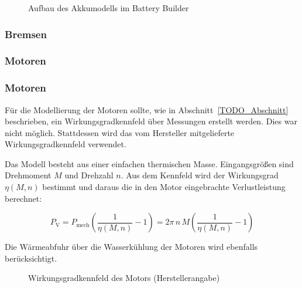 \begin{figure}[htbp]
    \centering
    \caption{Aufbau des Akkumodells im Battery Builder}
    \label{fig:battery_builder}
\end{figure}


\subsubsection{Bremsen}
\subsubsection{Motoren}
\subsubsection{Motoren}
\label{subsubsec:motoren}

Für die Modellierung der Motoren sollte, wie in Abschnitt~\ref{TODO_Abschnitt}
beschrieben, ein Wirkungsgradkennfeld über Messungen erstellt werden. Dies war
nicht möglich. Stattdessen wird das vom Hersteller mitgelieferte
Wirkungsgradkennfeld verwendet.

Das Modell besteht aus einer einfachen thermischen Masse. Eingangsgrößen sind
Drehmoment $M$ und Drehzahl $n$. Aus dem Kennfeld wird der Wirkungsgrad
$\eta(M,n)$ bestimmt und daraus die in den Motor eingebrachte Verlustleistung
berechnet:

\begin{equation}
    P_\mathrm{V} = P_\mathrm{mech} \left( \frac{1}{\eta(M,n)} - 1 \right)
                 = 2\pi\, n\, M \left( \frac{1}{\eta(M,n)} - 1 \right)
    \label{eq:verlustleistung_motor}
\end{equation}

Die Wärmeabfuhr über die Wasserkühlung der Motoren wird ebenfalls
berücksichtigt.

\begin{figure}[htbp]
    \centering
    \caption{Wirkungsgradkennfeld des Motors (Herstellerangabe)}
    \label{fig:motor_kennfeld}
\end{figure}


